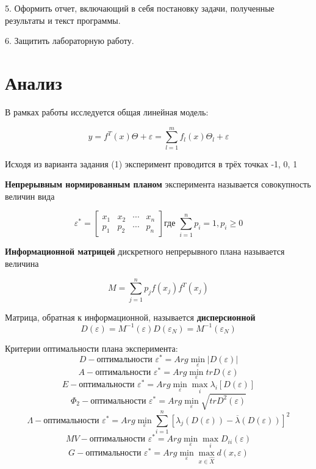 5.	Оформить отчет, включающий в себя постановку задачи, полученные результаты и текст программы.

6.	Защитить лабораторную работу. 


\section{Анализ}

В рамках работы исследуется общая линейная модель:

\[
y = f^T(x)\Theta + \varepsilon = \sum_{l=1}^m f_l(x)\Theta_l + \varepsilon
\]

Исходя из варианта задания (1) эксперимент проводится в трёх точках -1, 0, 1

{\bf Непрерывным нормированным планом} эксперимента называется совокупность величин вида

\[
	\varepsilon^*=
	\begin{bmatrix}
	    x_1		&	x_2		&	\cdots		&	x_n	\\
 	    p_1		&	p_2		&	\cdots		&	p_n
	\end{bmatrix}
	\text{где } \sum_{i=1}^n p_i = 1, p_i \geq 0
\] 

{\bf Информационной матрицей} дискретного непрерывного плана называется величина

\[M = \sum_{j=1}^n p_j f(x_j)f^T(x_j) \]

Матрица, обратная к информационной, называется {\bf дисперсионной}
\[ D(\varepsilon)=M^{-1}(\varepsilon) D(\varepsilon_N)=M^{-1}(\varepsilon_N) \]

Критерии оптимальности плана эксперимента:
\[ D-\text{оптимальности } \varepsilon^* = Arg \min_{\varepsilon} |D(\varepsilon)| \]
\[ A-\text{оптимальности } \varepsilon^* = Arg \min_{\varepsilon} tr D(\varepsilon) \]
\[ E-\text{оптимальности } \varepsilon^* = Arg \min_{\varepsilon} \max_i \lambda_i[D(\varepsilon)] \]
\[ \Phi_2-\text{оптимальности } \varepsilon^* = Arg \min_{\varepsilon} \sqrt{tr D^2(\varepsilon)} \]
\[ \Lambda-\text{оптимальности } \varepsilon^* = Arg \min_{\varepsilon} \sum_{i=1}^n [ \lambda_j(D(\varepsilon)) - \overline{\lambda}(D(\varepsilon)) ]^2 \]
\[ MV-\text{оптимальности } \varepsilon^* = Arg \min_{\varepsilon} \max_i D_{ii}(\varepsilon) \]
\[ G-\text{оптимальности } \varepsilon^* = Arg \min_{\varepsilon} \max_{x \in \hat{X}} d(x, \varepsilon) \]


